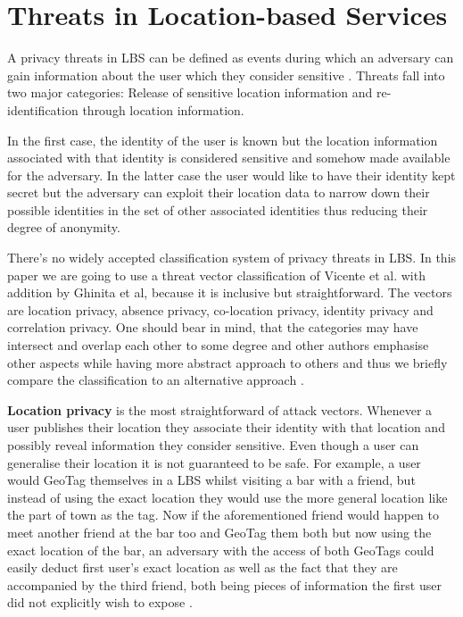 \documentclass[english]{tktltiki2}
\theoremstyle{definition}
\theoremstyle{remark}
\begin{document}
\section{Threats in Location-based Services}

A privacy threats in LBS can be defined as events during which an adversary can gain information about the user which they consider sensitive \cite{LocationPrivacy}. Threats fall into two major categories: Release of sensitive location information and re-identification through location information. \par In the first case, the identity of the user is known but the location information associated with that identity is considered sensitive and somehow made available for the adversary. In the latter case the user would like to have their identity kept secret but the adversary can exploit their location data to narrow down their possible identities in the set of other associated identities thus reducing their degree of anonymity. \par There's no widely accepted classification system of privacy threats in LBS. In this paper we are going to use a threat vector classification of Vicente et al. with addition by Ghinita et al\cite{LocationPrivacy, Ghinita2008}, because it is inclusive but straightforward. The vectors are location privacy, absence privacy, co-location privacy, identity privacy and correlation privacy. One should bear in mind, that the categories may have intersect and overlap each other to some degree and other authors emphasise other aspects while having more abstract approach to others and thus we briefly compare the classification to an alternative approach \cite{Bettini2009}.

\textbf{Location privacy} is the most straightforward of attack vectors. Whenever a user publishes their location they associate their identity with that location and possibly reveal information they consider sensitive. Even though a user can generalise their location it is not guaranteed to be safe. For example, a user would GeoTag themselves in a LBS whilst visiting a bar with a friend, but instead of using the exact location they would use the more general location like the part of town as the tag. Now if the aforementioned friend would happen to meet another friend at the bar too and GeoTag them both but now using the exact location of the bar, an adversary with the access of both GeoTags could easily deduct first user's exact location as well as the fact that they are accompanied by the third friend, both being pieces of information the first user did not explicitly wish to expose \cite{LocationPrivacy}.
\end{document}
